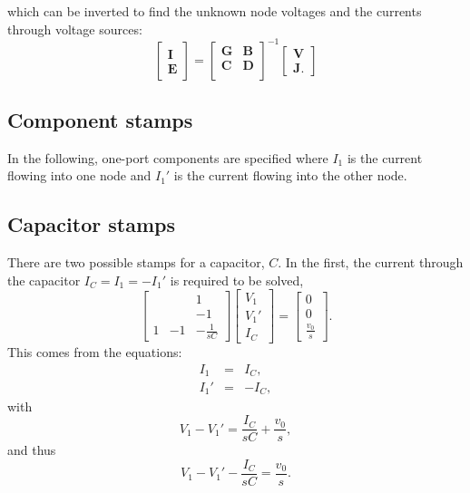 \documentclass[a4paper, 12pt]{article}
\newcommand{\mat}[1]{\mathbf{#1}}
\renewcommand{\vec}[1]{\mathbf{#1}}
\begin{document}
%
which can be inverted to find the unknown node voltages and the
currents through voltage sources:
%
\begin{equation}
  \begin{bmatrix}
    \vec{I} \\ \vec{E}
  \end{bmatrix}
=
  \begin{bmatrix}
    \mat{G} & \mat{B} \\
    \mat{C} & \mat{D} \\
  \end{bmatrix}^{-1}
  \begin{bmatrix}
    \vec{V} \\ \vec{J}.
  \end{bmatrix}
\end{equation}


\subsection{Component stamps}

In the following, one-port components are specified where $I_1$ is the
current flowing into one node and $I_1'$ is the current flowing into
the other node.


\subsection{Capacitor stamps}

There are two possible stamps for a capacitor, $C$.  In the first,
the current through the capacitor $I_C=I_1=-I_1'$ is required to be solved,
%
\begin{equation}
  \begin{bmatrix}
     &  & 1 \\
     &  & -1 \\
1 & -1 & -\frac{1}{sC}
  \end{bmatrix}
  \begin{bmatrix}
    V_1 \\ V_1' \\ I_C
  \end{bmatrix}
=
\begin{bmatrix}
  0 \\ 0 \\ \frac{v_0}{s}
\end{bmatrix}.
\end{equation}
%
This comes from the equations:
%
\begin{eqnarray}
\label{eqn:C_I1}
  I_1 & = & I_C, \\
  I_1' & = & -I_C,
\label{eqn:C_I2}
\end{eqnarray}
%
with
%
\begin{equation}
    V_1 - V_1'  =  \frac{I_C}{sC} + \frac{v_0}{s},
\end{equation}
%
and thus
%
\begin{equation}
    V_1 - V_1' - \frac{I_C}{sC} =  \frac{v_0}{s}.
\end{equation}
\end{document}
